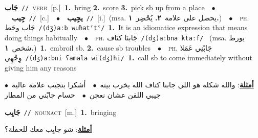\documentclass[10pt,a4paper,twoside]{article} %
\begin{document}
\begin{multicols}{2}
{\setlength\topsep{0pt}\textbf{\foreignlanguage{arabic}{جَاب}}\ {\color{gray}\texttt{//}\color{black}}\ \textsc{verb}\ [p.]\ \textbf{1.}~bring  \textbf{2.}~score  \textbf{3.}~pick sb up from a place\ \ $\bullet$\ \ \setlength\topsep{0pt}\textbf{\foreignlanguage{arabic}{جِيب}}\ {\color{gray}\texttt{//}\color{black}}\ [c.]\ \ $\bullet$\ \ \setlength\topsep{0pt}\textbf{\foreignlanguage{arabic}{يجِيب}}\ {\color{gray}\texttt{//}\color{black}}\ [i.]\ \color{gray}(msa. \foreignlanguage{arabic}{يحصل على علامة}~\foreignlanguage{arabic}{\textbf{٢.}}  \foreignlanguage{arabic}{يُحْضِر}~\foreignlanguage{arabic}{\textbf{١.}})\color{black}\ \ $\bullet$\ \ \textsc{ph.} \color{gray} \foreignlanguage{arabic}{جَاب وحَط}\color{black}\ {\color{gray}\texttt{/{\sffamily (dʒ)aːb wuħatˤtˤ}/}\color{black}}\ \textbf{1.}~It is an idiomatice expression that means doing things habitually\ \ $\bullet$\ \ \textsc{ph.} \color{gray} \foreignlanguage{arabic}{جَابنَا كتَاف}\color{black}\ {\color{gray}\texttt{/{\sffamily (dʒ)aːbna ktaːf}/}\color{black}}\ \color{gray} (msa. \foreignlanguage{arabic}{يورط شخص}~\foreignlanguage{arabic}{\textbf{١.}})\color{black}\ \textbf{1.}~embroil sb.  \textbf{2.}~cause sb troubles\ \ $\bullet$\ \ \textsc{ph.} \color{gray} \foreignlanguage{arabic}{جَابْنِي عَمَلا وِجْهِي}\color{black}\ {\color{gray}\texttt{/{\sffamily (dʒ)aːbni ʕamala wi(dʒ)hi}/}\color{black}}\ \textbf{1.}~call sb to come immediately without giving him any reasons\  \begin{flushright}\color{gray}\foreignlanguage{arabic}{\textbf{\underline{\foreignlanguage{arabic}{أمثلة}}}: والله شكله هو اللي جابنا كتاف الله يخرب بيته\ $\bullet$\ \  أشكرا بتجيب علامة عالية\ $\bullet$\ \  جيبي اللقن عشان نعجن\ $\bullet$\ \  حسام جابْني من المطار}\end{flushright}\color{black}} \vspace{2mm}

{\setlength\topsep{0pt}\textbf{\foreignlanguage{arabic}{جَايِب}}\ {\color{gray}\texttt{//}\color{black}}\ \textsc{noun\textunderscore act}\ [m.]\ \textbf{1.}~bringing\  \begin{flushright}\color{gray}\foreignlanguage{arabic}{\textbf{\underline{\foreignlanguage{arabic}{أمثلة}}}: شو جايِب معك للحفلة؟}\end{flushright}\color{black}} \vspace{2mm}


\end{multicols}
\end{document}
